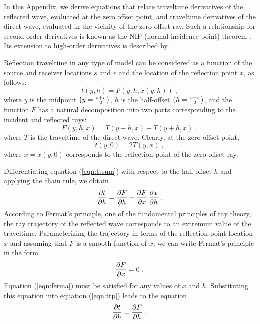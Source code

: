 In this Appendix, we derive equations that relate traveltime
derivatives of the reflected wave, evaluated at the zero offset point,
and traveltime derivatives of the direct wave, evaluated in the
vicinity of the zero-offset ray. Such a relationship for second-order
derivatives is known as the NIP (normal incidence point) theorem
\cite[]{chergr,hubkrey,GEO48-08-10511062}. Its extension to high-order
derivatives is described by \cite{fomel}.

Reflection traveltime in any type of model can be considered as a
function of the source and receiver locations $s$ and $r$ and the
location of the reflection point $x$, as follows:
\begin{equation}
t(y,h) = F\left(y,h,x(y,h)\right)\;,
\label{eqn:ttsum}
\end{equation}
where $y$ is the midpoint $\left(y = {{s + r} \over 2}\right)$, $h$ is
the half-offset $\left(h = {{r - s} \over 2}\right)$, and the
function $F$ has a natural decomposition into two parts corresponding
to the incident and reflected rays:
\begin{equation}
F(y,h,x) = T(y-h,x) + T(y+h,x)\;,
\label{eqn:f2t}
\end{equation}
where $T$ is the traveltime of the direct wave. Clearly, at the
zero-offset point,
\begin{equation}
t(y,0) = 2 T(y,x)\;,
\label{eqn:2t2t0}
\end{equation}
where $x=x(y,0)$ corresponds to the reflection point of the
zero-offset ray.

Differentiating equation (\ref{eqn:ttsum}) with respect to the half-offset
$h$ and applying the chain rule, we obtain
\begin{equation}
{{\partial t} \over {\partial h}} = {{\partial F} \over {\partial h}}
+ {{\partial F} \over {\partial x}}\,{{\partial x} \over {\partial h}}\;.
\label{eqn:ttp}
\end{equation}
According to Fermat's principle, one of the
fundamental principles of ray theory, the ray
trajectory of the reflected wave corresponds to an
extremum value of the traveltime. Parameterizing
the trajectory in terms of the reflection point
location $x$ and assuming that $F$ is a smooth
function of $x$, we can write Fermat's principle
in the form 
\begin{equation}
{{\partial F} \over {\partial x}} = 0\;.
\label{eqn:ferma}
\end{equation}
Equation (\ref{eqn:ferma}) must be satisfied for any values of $x$ and
$h$. Substituting this equation into equation (\ref{eqn:ttp}) leads to the
equation
\begin{equation}
{{\partial t} \over {\partial h}} = {{\partial F} \over {\partial h}}\;.
\label{eqn:tp1}
\end{equation}

